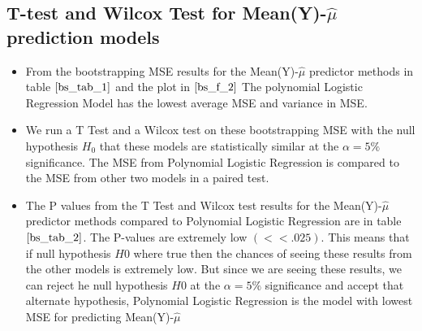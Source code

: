 \documentclass[twoside,12pt]{article}
\begin{document}
\subsection{T-test and Wilcox Test for  Mean(Y)-$\hat{\mu}$ prediction models}
\begin{itemize}
	\item
	From the bootstrapping MSE results for the  Mean(Y)-$\hat{\mu}$ predictor methods in table $\eqref{bs_tab_1}$ and the plot in $\eqref{bs_f_2}$ The polynomial Logistic Regression Model has the lowest average MSE and variance in MSE.
	\item
	We run a T Test and a Wilcox test on these bootstrapping MSE with the null hypothesis $H_0$ that these models are statistically similar at the $\alpha = 5\%$ significance. The MSE from Polynomial Logistic Regression is compared to the MSE from other two models in a paired test.
	\FloatBarrier
	\item
	The P values from the T Test and Wilcox test results for the  Mean(Y)-$\hat{\mu}$ predictor methods compared to Polynomial Logistic Regression are in table $\eqref{bs_tab_2}$. The P-values are extremely low $(<<.025)$. This means that if null hypothesis $H0$ where true then the chances of seeing these results from the other models is extremely low. But since we are seeing these results, we can reject he null hypothesis $H0$ at the $\alpha = 5\%$ significance and accept that alternate hypothesis, Polynomial Logistic Regression is the model with lowest MSE for predicting  Mean(Y)-$\hat{\mu}$
	\begin{table}[h]
		\centering
		\caption[]{T-test and Wilcox Test on Bootstrapping Results - P-Value  Mean(Y)-$\hat{\mu}$ for models Vs Polynomial Logistic Regression}
		\label{bs_tab_2}
	\end{table}
\end{itemize}
	
\end{document}
